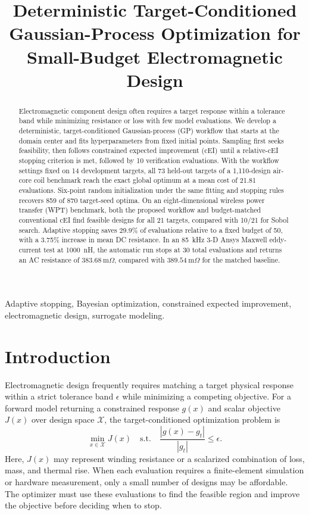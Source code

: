 \documentclass[10pt,conference,letterpaper]{IEEEtran}
\title{Deterministic Target-Conditioned Gaussian-Process Optimization for Small-Budget Electromagnetic Design}
\author{\IEEEauthorblockN{Le Dong}
\IEEEauthorblockA{\textit{School of Electrical Engineering}\\
\textit{Xi'an Jiaotong University}\\
Xi'an, Shaanxi 710049, China\\
\texttt{leroi\_2024@stu.xjtu.edu.cn}}}
\begin{document}
\maketitle

\begin{abstract}
Electromagnetic component design often requires a target response within a tolerance band while minimizing resistance or loss with few model evaluations. We develop a deterministic, target-conditioned Gaussian-process (GP) workflow that starts at the domain center and fits hyperparameters from fixed initial points. Sampling first seeks feasibility, then follows constrained expected improvement (cEI) until a relative-cEI stopping criterion is met, followed by 10 verification evaluations. With the workflow settings fixed on 14 development targets, all 73 held-out targets of a 1,110-design air-core coil benchmark reach the exact global optimum at a mean cost of 21.81 evaluations. Six-point random initialization under the same fitting and stopping rules recovers 859 of 870 target-seed optima. On an eight-dimensional wireless power transfer (WPT) benchmark, both the proposed workflow and budget-matched conventional cEI find feasible designs for all 21 targets, compared with 10/21 for Sobol search. Adaptive stopping saves 29.9\% of evaluations relative to a fixed budget of 50, with a 3.75\% increase in mean DC resistance. In an 85~kHz 3-D Ansys Maxwell eddy-current test at 1000~nH, the automatic run stops at 30 total evaluations and returns an AC resistance of $383.68~\mathrm{m}\Omega$, compared with $389.54~\mathrm{m}\Omega$ for the matched baseline.
\end{abstract}

\begin{IEEEkeywords}
Adaptive stopping, Bayesian optimization, constrained expected improvement, electromagnetic design, surrogate modeling.
\end{IEEEkeywords}

\section{Introduction}
Electromagnetic design frequently requires matching a target physical response within a strict tolerance band $\epsilon$ while minimizing a competing objective. For a forward model returning a constrained response $g(x)$ and scalar objective $J(x)$ over design space $\mathcal X$, the target-conditioned optimization problem is
\begin{equation}
 \min_{x\in\mathcal X}J(x)\quad\mathrm{s.t.}\quad
 \frac{|g(x)-g_t|}{|g_t|}\leq\epsilon .
 \label{eq:problem}
\end{equation}
Here, $J(x)$ may represent winding resistance or a scalarized combination of loss, mass, and thermal rise. When each evaluation requires a finite-element simulation or hardware measurement, only a small number of designs may be affordable. The optimizer must use these evaluations to find the feasible region and improve the objective before deciding when to stop.
\end{document}
